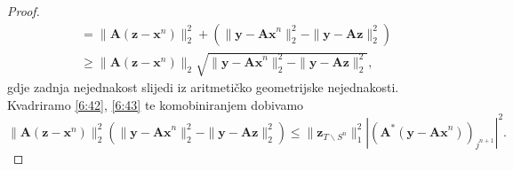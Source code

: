 \documentclass[a4paper,twoside,12pt]{memoir} %
\newcommand{\vect}[1]{\mathbf{#1}}
\renewcommand{\vec}{\vect}
\newcommand{\norm}[1]{\|{#1}\|}
\begin{document}
\begin{proof}
\begin{align}
        & = \norm{\vec A(\vec z - \vec x^n)}_2^2 + (\norm{\vec y - \vec{Ax}^n}_2^2 - \norm{\vec y - \vec{Az}}_2^2) \nonumber \\[0.5em]
        & \geq \norm{\vec A (\vec z - \vec x^n)}_2 \sqrt{\norm{\vec y - \vec{Ax}^n}_2^2 - \norm{\vec y - \vec{Az}}_2^2}, \label{6:43}
    \end{align}
    gdje zadnja nejednakost slijedi iz aritmeti\v{c}ko geometrijske nejednakosti. Kvadriramo \eqref{6:42}, \eqref{6:43} te komobiniranjem dobivamo
    \begin{equation*}
        \norm{\vec A(\vec z - \vec x^n)}_2^2 (\norm{\vec y - \vec {Ax}^n}_2^2 - \norm{\vec y - \vec{Az}}_2^2) \leq \norm{\vec z_{T \backslash S^n}}_1^2 |(\vec A^*(\vec y - \vec {Ax}^n))_{j^{n+1}}|^2.
    \end{equation*}
\end{proof}
\end{document}
